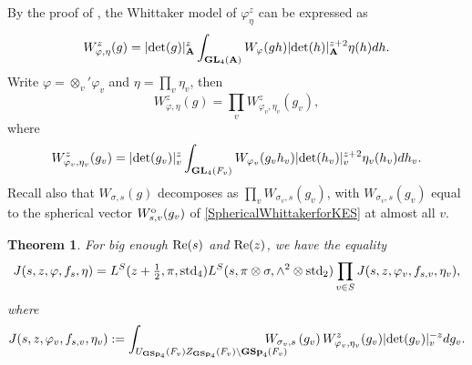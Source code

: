 \documentclass[11pt, reqno]{amsart}
\theoremstyle{plain}
\newtheorem{theorem}{Theorem}[section]
\theoremstyle{definition}
\theoremstyle{remark}
\theoremstyle{plain}
\def\A{{\bf A}}
\def\GSp{{\mathbf{GSp}}}
\def\GL{\mathbf{GL}}
\begin{document}
  By the proof of \cite[Theorem 1]{Watanabe:Global:Theta},  the Whittaker model of $\varphi_\eta^z$ can be expressed as 
$$W_{\varphi,\eta}^z(g) = | {\rm det}(g)|_\A^{z} \int_{\GL_4(\A)} W_\varphi(g h)| {\rm det}(h)|_\A^{z+2} \eta(h) d h. $$
Write $\varphi = \otimes_v ' \varphi_v$ and $\eta = \prod_v \eta_v$, then 
$$W_{\varphi,\eta}^z(g) = \prod_v W_{\varphi_v,\eta_v}^z(g_v),$$
   where
\begin{align}\label{eq_local_whittaker_theta}
W_{\varphi_v,\eta_v}^z(g_v) =  | {\rm det}(g_v)|_v^{z} \int_{\GL_4(F_v)} W_{\varphi_v}(g_v h_v)| {\rm det}(h_v)|_v^{z+2} \eta_v(h_v) d h_v. 
\end{align}
Recall also that $W_{\sigma,s}(g)$ decomposes as $\prod_v W_{\sigma_v,s}(g_v)$, with $W_{\sigma_v,s}(g_v)$ equal to the spherical vector $W_{s,v}^{\rm o}(g_v)$ of \eqref{SphericalWhittakerforKES} at almost all $v$.
\begin{theorem}\label{THM_two_var_integral} For big enough ${\rm Re}(s)$ and ${\rm Re}(z)$, we have the equality 
    \[ J(s,z,\varphi,f_s, \eta) = L^S(z+ \tfrac{1}{2},\pi,{\rm std}_4) L^S(s,\pi \otimes \sigma,\wedge^2 \otimes \mathrm{std}_2) \prod_{v \in S} J(s,z,\varphi_v,f_{s,v},\eta_v),\]
    where \[J(s,z,\varphi_v,f_{s,v},\eta_v) :=  \int_{U_{\GSp_4}(F_v)Z_{\GSp_4}(F_v)\setminus {\GSp_4}(F_v)} \!\!\!\!\!\!\!\!\!\!\!\!W_{\sigma_v,s}\left(g_v\right)W_{\varphi_v,\eta_v}^z(g_v)| {\rm det}(g_v)|_v^{-z}dg_v.\]
\end{theorem}
\end{document}
